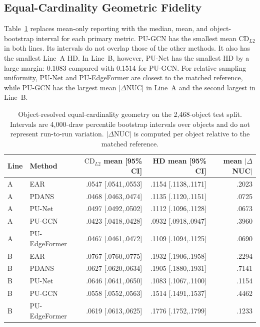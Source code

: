 \subsection{Equal-Cardinality Geometric Fidelity}
\label{sec:equaln-geometry}

Table~\ref{tab:geometry-bootstrap} replaces mean-only reporting with the median, mean, and object-bootstrap interval for each primary metric. PU-GCN has the smallest mean $\mathrm{CD}_{L2}$ in both lines. Its intervals do not overlap those of the other methods. It also has the smallest Line~A HD. In Line~B, however, PU-Net has the smallest HD by a large margin: 0.1083 compared with 0.1514 for PU-GCN. For relative sampling uniformity, PU-Net and PU-EdgeFormer are closest to the matched reference, while PU-GCN has the largest mean $|\Delta\mathrm{NUC}|$ in Line~A and the second largest in Line~B.

\begin{table}[p]
\centering
\small
\begin{tabular}{llrrr}
\toprule
Line & Method & $\mathrm{CD}_{L2}$ mean [95\% CI] & HD mean [95\% CI] & mean $|\Delta$NUC$|$ \\
\midrule
A & EAR & .0547 [.0541,.0553] & .1154 [.1138,.1171] & .2023 \\
A & PDANS & .0468 [.0463,.0474] & .1135 [.1120,.1151] & .0725 \\
A & PU-Net & .0497 [.0492,.0502] & .1112 [.1096,.1128] & .0673 \\
A & PU-GCN & .0423 [.0418,.0428] & .0932 [.0918,.0947] & .3960 \\
A & PU-EdgeFormer & .0467 [.0461,.0472] & .1109 [.1094,.1125] & .0690 \\
\midrule
B & EAR & .0767 [.0760,.0775] & .1932 [.1906,.1958] & .2294 \\
B & PDANS & .0627 [.0620,.0634] & .1905 [.1880,.1931] & .7141 \\
B & PU-Net & .0646 [.0641,.0650] & .1083 [.1067,.1100] & .1154 \\
B & PU-GCN & .0558 [.0552,.0563] & .1514 [.1491,.1537] & .4462 \\
B & PU-EdgeFormer & .0619 [.0613,.0625] & .1776 [.1752,.1799] & .1233 \\
\bottomrule
\end{tabular}
\caption{Object-resolved equal-cardinality geometry on the 2,468-object test split. Intervals are 4,000-draw percentile bootstrap intervals over objects and do not represent run-to-run variation. $|\Delta$NUC$|$ is computed per object relative to the matched reference.}
\label{tab:geometry-bootstrap}
\end{table}

